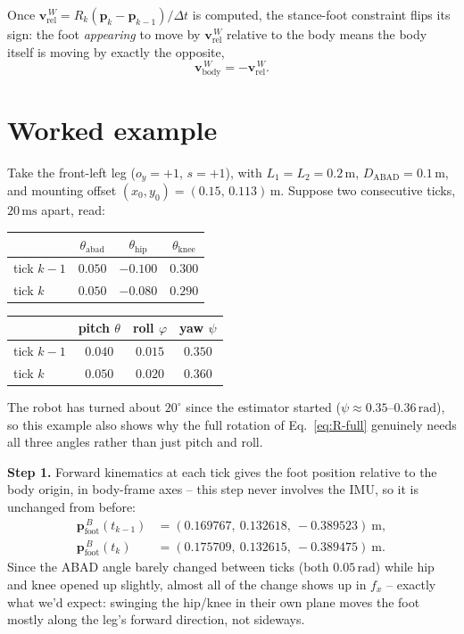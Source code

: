 \documentclass[11pt]{article}
\begin{document}
Once $\mathbf{v}_{\text{rel}}^{\,W} = R_k(\mathbf{p}_k - \mathbf{p}_{k-1})/\Delta t$ is
computed, the stance-foot constraint flips its sign: the foot
\emph{appearing} to move by $\mathbf{v}_{\text{rel}}^{\,W}$ relative to the body
means the body itself is moving by exactly the opposite,
\begin{equation}
\mathbf{v}_{\text{body}}^{\,W} = -\mathbf{v}_{\text{rel}}^{\,W}.
\end{equation}

\section{Worked example}
\label{sec:worked-example}

Take the front-left leg ($o_y = +1$, $s = +1$), with
$L_1 = L_2 = 0.2\,\text{m}$, $D_{\text{ABAD}} = 0.1\,\text{m}$, and mounting
offset $(x_0, y_0) = (0.15,\, 0.113)\,\text{m}$. Suppose two consecutive
ticks, $20\,\text{ms}$ apart, read:

\begin{center}
\begin{tabular}{@{}lccc@{}}
\toprule
 & $\theta_{\text{abad}}$ & $\theta_{\text{hip}}$ & $\theta_{\text{knee}}$ \\
\midrule
tick $k-1$ & $0.050$ & $-0.100$ & $0.300$ \\
tick $k$   & $0.050$ & $-0.080$ & $0.290$ \\
\bottomrule
\end{tabular}
\qquad
\begin{tabular}{@{}lccc@{}}
\toprule
 & pitch $\theta$ & roll $\varphi$ & yaw $\psi$ \\
\midrule
tick $k-1$ & $0.040$ & $0.015$ & $0.350$ \\
tick $k$   & $0.050$ & $0.020$ & $0.360$ \\
\bottomrule
\end{tabular}
\end{center}
The robot has turned about $20^\circ$ since the estimator started ($\psi
\approx 0.35$--$0.36\,\text{rad}$), so this example also shows why the full
rotation of Eq.~\eqref{eq:R-full} genuinely needs all three angles rather
than just pitch and roll.

\noindent \textbf{Step 1.} Forward kinematics at each tick gives the
foot position relative to the body origin, in body-frame axes -- this step
never involves the IMU, so it is unchanged from before:
\begin{align}
\mathbf{p}_{\text{foot}}^{\,B}(t_{k-1}) &= (0.169767,\ 0.132618,\ -0.389523)\ \text{m}, \\
\mathbf{p}_{\text{foot}}^{\,B}(t_{k})   &= (0.175709,\ 0.132615,\ -0.389475)\ \text{m}.
\end{align}
Since the ABAD angle barely changed between ticks (both $0.05\,\text{rad}$)
while hip and knee opened up slightly, almost all of the change shows up in
$f_x$ -- exactly what we'd expect: swinging the hip/knee in their own plane
moves the foot mostly along the leg's forward direction, not sideways.
\end{document}
